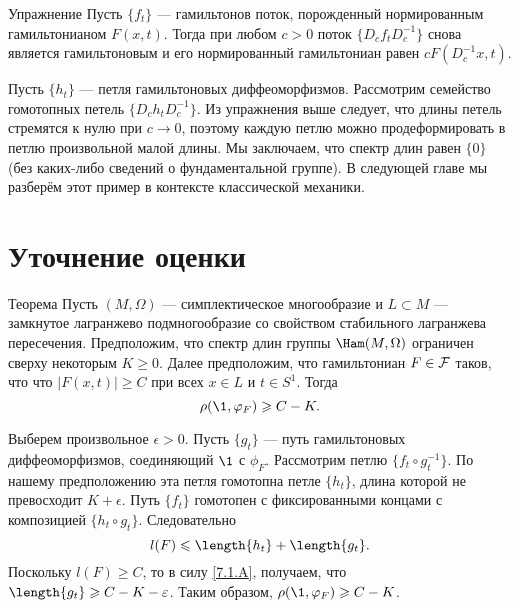 \begin{ex*}{Упражнение}
Пусть $\{f_t\}$ --- гамильтонов поток, порожденный нормированным
гамильтонианом $F (x, t)$.
Тогда при любом $c> 0$ поток $\{D_c f_t D_c^{-1}\}$ снова является
гамильтоновым и его нормированный гамильтониан равен $cF (D_c^{-1} x, t)$.
\end{ex*}

Пусть $\{h_t\}$ --- петля гамильтоновых диффеоморфизмов.
Рассмотрим семейство гомотопных петель $\{D_c h_t D_c ^{-1}\}$.
Из упражнения выше следует, что длины петель стремятся к нулю при $c \to 0$, поэтому каждую петлю можно продеформировать в петлю произвольной малой длины.
Мы заключаем, что спектр длин равен $\{0\}$ (без каких-либо сведений о фундаментальной группе).
В следующей главе мы разберём этот пример в контексте классической механики.

\section{Уточнение оценки}

\begin{thm}{Теорема}\label{7.4.A}
Пусть $(M, \Omega)$ --- симплектическое многообразие и $L \subset M$
--- замкнутое лагранжево подмногообразие со свойством стабильного
лагранжева пересечения. 
Предположим, что спектр длин группы $\Ham (M, \Omega)$ ограничен
сверху некоторым $K \ge 0$. 
Далее предположим, что гамильтониан $F \in \mathcal{F}$ таков, что что $| F (x,
t) | \ge C$ при всех $x \in L$ и $t \in S^1$. 
Тогда 
\[\rho (\1, \phi_F) \ge C - K.\]
\end{thm}

Выберем произвольное $\epsilon> 0$. 
Пусть $\{g_t\}$ --- путь гамильтоновых диффеоморфизмов, соединяющий $\1$ с $\phi_F$.
Рассмотрим петлю $\{f_t \circ g_t ^{-1}\}$.
По нашему предположению эта петля гомотопна петле $\{h_t\}$, длина которой не превосходит $K + \epsilon$.
Путь $\{f_t\}$ гомотопен с фиксированными концами с композицией $\{h_t \circ g_t\}$.
Следовательно
\[l (F) \le \length \{h_t\} + \length \{g_t\}.\]
Поскольку $l (F) \ge C$, то в силу \ref{7.1.A}, получаем, что $\length \{g_t\} \ge C \z- K - \epsilon$.
Таким образом, $\rho (\1, \phi_F) \ge C - K$.
\qeds
